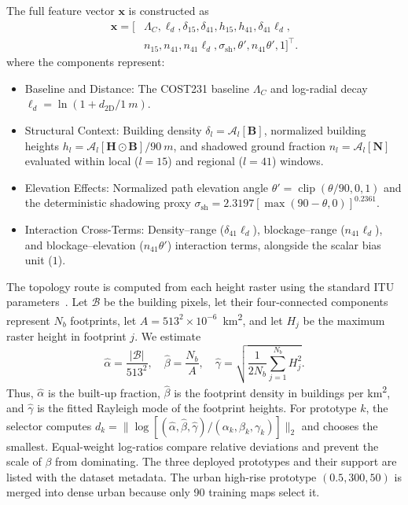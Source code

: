 \documentclass[10pt,conference,letterpaper]{IEEEtran}
\begin{document}
The full feature vector $\mathbf x$ is constructed as
\begin{equation}
\begin{aligned}
\mathbf x=[&\Lambda_C,\ell_d,\delta_{15},\delta_{41},h_{15},h_{41},
\delta_{41}\ell_d,\\
&n_{15},n_{41},n_{41}\ell_d,\sigma_{\mathrm{sh}},\theta',
n_{41}\theta',1]^{\top}.
\end{aligned}
\label{eq:nlos-vector}
\end{equation}
where the components represent:
\begin{itemize}
    \item Baseline and Distance: The COST231 baseline $\Lambda_C$ and
    log-radial decay $\ell_d=\ln(1+d_{\mathrm{2D}}/\SI{1}{m})$.
    \item Structural Context: Building density
    $\delta_l=\mathcal A_l[\mathbf B]$, normalized building heights
    $h_l=\mathcal A_l[\mathbf H\odot\mathbf B]/\SI{90}{m}$, and shadowed
    ground fraction $n_l=\mathcal A_l[\mathbf N]$ evaluated within local
    ($l=15$) and regional ($l=41$) windows.
    \item Elevation Effects: Normalized path elevation angle
    $\theta'=\operatorname{clip}(\theta/90,0,1)$ and the deterministic
    shadowing proxy $\sigma_{\mathrm{sh}}=2.3197[\max(90-\theta,0)]^{0.2361}$.
    \item Interaction Cross-Terms: Density--range ($\delta_{41}\ell_d$),
    blockage--range ($n_{41}\ell_d$), and blockage--elevation
    ($n_{41}\theta'$) interaction terms, alongside the scalar bias unit ($1$).
\end{itemize}

The topology route is computed from each height raster using the standard ITU
parameters~\cite{iturp1410,saboor2024geometry}. Let $\mathcal B$ be the
building pixels, let their four-connected components represent $N_b$
footprints, let $A=513^2\times10^{-6}$~\si{km^2}, and let $H_j$ be the maximum
raster height in footprint $j$. We estimate
\begin{equation}
\hat\alpha=\frac{|\mathcal B|}{513^2},\quad
\hat\beta=\frac{N_b}{A},\quad
\hat\gamma=\sqrt{\frac{1}{2N_b}\sum_{j=1}^{N_b}H_j^2}.
\label{eq:itu-routing}
\end{equation}
Thus, $\hat\alpha$ is the built-up fraction, $\hat\beta$ is the footprint
density in buildings per \si{km^2}, and $\hat\gamma$ is the fitted Rayleigh
mode of the footprint heights. For prototype $k$, the selector computes
$d_k=\|\log[(\hat\alpha,\hat\beta,\hat\gamma)/
(\alpha_k,\beta_k,\gamma_k)]\|_2$ and chooses the smallest. Equal-weight
log-ratios compare relative deviations and prevent the scale of $\beta$ from
dominating. The three deployed prototypes and their support are listed with the
dataset metadata. The urban high-rise prototype $(0.5,300,50)$ is merged into
dense urban because only 90 training maps select it.
\end{document}
